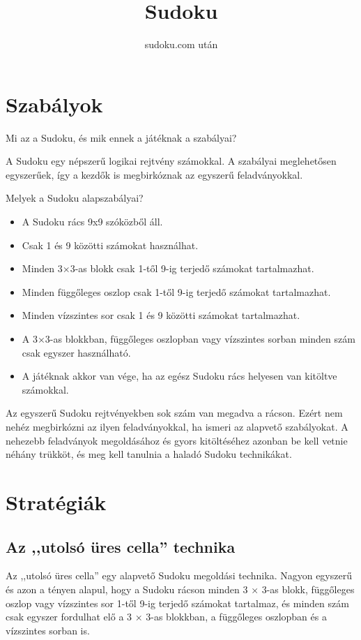 \documentclass[a4paper,12pt,twoside]{article}
\title{Sudoku}
\author{sudoku.com után}
\begin{document}
 
\maketitle

\section{Szabályok}

Mi az a Sudoku, és mik ennek a játéknak a szabályai?

A Sudoku egy népszerű logikai rejtvény számokkal. A szabályai meglehetősen egyszerűek, így a kezdők is megbirkóznak az egyszerű feladványokkal.

Melyek a Sudoku alapszabályai?

\begin{itemize}
    \item A Sudoku rács 9x9 szóközből áll.
    \item Csak 1 és 9 közötti számokat használhat.
    \item Minden 3×3-as blokk csak 1-től 9-ig terjedő számokat tartalmazhat.
    \item Minden függőleges oszlop csak 1-től 9-ig terjedő számokat tartalmazhat.
    \item Minden vízszintes sor csak 1 és 9 közötti számokat tartalmazhat.
    \item A 3×3-as blokkban, függőleges oszlopban vagy vízszintes sorban minden szám csak egyszer használható.
    \item A játéknak akkor van vége, ha az egész Sudoku rács helyesen van kitöltve számokkal.
\end{itemize}

Az egyszerű Sudoku rejtvényekben sok szám van megadva a rácson. Ezért nem nehéz megbirkózni az ilyen feladványokkal, ha ismeri az alapvető szabályokat. A nehezebb feladványok megoldásához és gyors kitöltéséhez azonban be kell vetnie néhány trükköt, és meg kell tanulnia a haladó Sudoku technikákat.

\clearpage
\section{Stratégiák}

\subsection{Az ,,utolsó üres cella'' technika}

Az ,,utolsó üres cella'' egy alapvető Sudoku megoldási technika. Nagyon egyszerű és azon a tényen alapul, hogy a Sudoku rácson minden 3 × 3-as blokk, függőleges oszlop vagy vízszintes sor 1-től 9-ig terjedő számokat tartalmaz, és minden szám csak egyszer fordulhat elő a 3 × 3-as blokkban, a függőleges oszlopban és a vízszintes sorban is.
 
\end{document}
